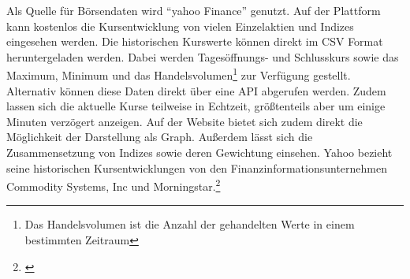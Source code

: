 
Als Quelle für Börsendaten wird \enquote{yahoo Finance} genutzt. Auf der Plattform kann kostenlos die Kursentwicklung von vielen Einzelaktien und Indizes eingesehen werden. Die historischen Kurswerte können direkt im \gls{CSV} Format heruntergeladen werden. Dabei werden Tagesöffnungs- und Schlusskurs sowie das Maximum, Minimum und das Handelsvolumen\footnote{Das Handelsvolumen ist die Anzahl der gehandelten Werte in einem bestimmten Zeitraum} zur Verfügung gestellt. Alternativ können diese Daten direkt über eine \gls{API} abgerufen werden. Zudem lassen sich die aktuelle Kurse teilweise in Echtzeit, größtenteils aber um einige Minuten verzögert anzeigen. Auf der Website bietet sich zudem direkt die Möglichkeit der Darstellung als Graph. Außerdem lässt sich die Zusammensetzung von Indizes sowie deren Gewichtung einsehen. Yahoo bezieht seine historischen Kursentwicklungen von den Finanzinformationsunternehmen Commodity Systems, Inc und Morningstar.\footnote{\cite[Vgl.][]{YahooFinanceSources}}


\clearpage